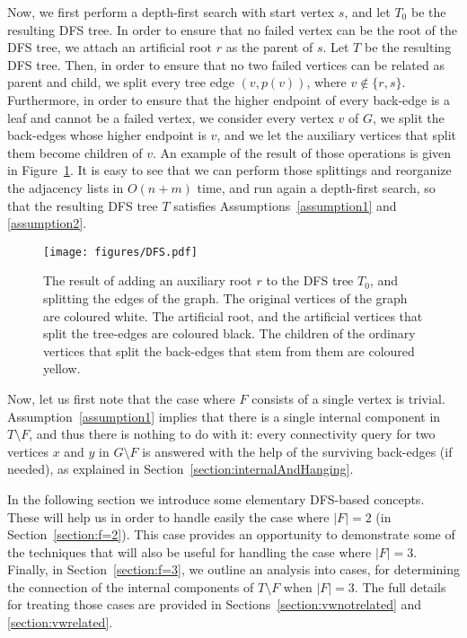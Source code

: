 \documentclass[11pt,a4paper]{article}
\begin{document}
Now, we first perform a depth-first search with start vertex $s$, and let $T_0$ be the resulting DFS tree. In order to ensure that no failed vertex can be the root of the DFS tree, we attach an artificial root $r$ as the parent of $s$. Let $T$ be the resulting DFS tree. Then, in order to ensure that no two failed vertices can be related as parent and child, we split every tree edge $(v,p(v))$, where $v\notin\{r,s\}$. Furthermore, in order to ensure that the higher endpoint of every back-edge is a leaf and cannot be a failed vertex, we consider every vertex $v$ of $G$, we split the back-edges whose higher endpoint is $v$, and we let the auxiliary vertices that split them become children of $v$. An example of the result of those operations is given in Figure~\ref{figure:DFS}. It is easy to see that we can perform those splittings and reorganize the adjacency lists in $O(n+m)$ time, and run again a depth-first search, so that the resulting DFS tree $T$ satisfies Assumptions~\ref{assumption1} and \ref{assumption2}.

\begin{figure}[h!]\centering
\texttt{[image: figures/DFS.pdf]}
\caption{\small{The result of adding an auxiliary root $r$ to the DFS tree $T_0$, and splitting the edges of the graph. The original vertices of the graph are coloured white. The artificial root, and the artificial vertices that split the tree-edges are coloured black. The children of the ordinary vertices that split the back-edges that stem from them are coloured yellow.}}\label{figure:DFS}
\end{figure}

Now, let us first note that the case where $F$ consists of a single vertex is trivial. Assumption~\ref{assumption1} implies that there is a single internal component in $T\setminus F$, and thus there is nothing to do with it: every connectivity query for two vertices $x$ and $y$ in $G\setminus F$ is answered with the help of the surviving back-edges (if needed), as explained in Section~\ref{section:internalAndHanging}. 

In the following section we introduce some elementary DFS-based concepts. These will help us in order to handle easily the case where $|F|=2$ (in Section~\ref{section:f=2}). This case provides an opportunity to demonstrate some of the techniques that will also be useful for handling the case where $|F|=3$. Finally, in Section~\ref{section:f=3}, we outline an analysis into cases, for determining the connection of the internal components of $T\setminus F$ when $|F|=3$. The full details for treating those cases are provided in Sections~\ref{section:vwnotrelated} and \ref{section:vwrelated}.
\end{document}
